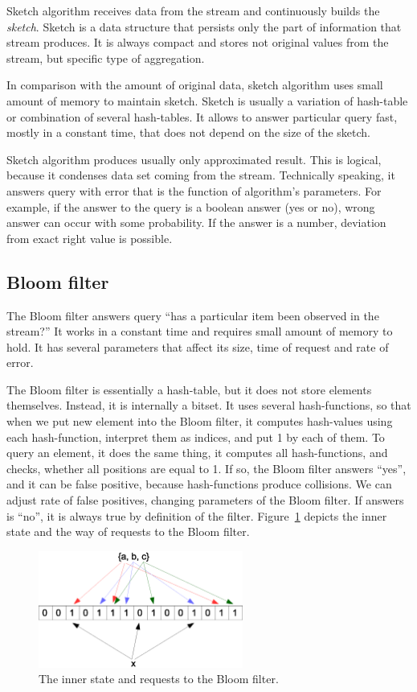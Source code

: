 Sketch algorithm receives data from the stream and continuously builds the \textit{sketch}.
Sketch is a data structure that persists only the part of information that stream produces.
It is always compact and stores not original values from the stream, but specific type of aggregation.

In comparison with the amount of original data, sketch algorithm uses small amount of memory to maintain sketch.
Sketch is usually a variation of hash-table or combination of several hash-tables.
It allows to answer particular query fast, mostly in a constant time, that does not depend on the size of the sketch.

Sketch algorithm produces usually only approximated result.
This is logical, because it condenses data set coming from the stream.
Technically speaking, it answers query with error that is the function of algorithm's parameters.
For example, if the answer to the query is a boolean answer (yes or no), wrong answer can occur with some probability.
If the answer is a number, deviation from exact right value is possible.

\subsection{Bloom filter}

The Bloom filter answers query ``has a particular item been observed in the stream?''
It works in a constant time and requires small amount of memory to hold.
It has several parameters that affect its size, time of request and rate of error.

The Bloom filter is essentially a hash-table, but it does not store elements themselves.
Instead, it is internally a bitset.
It uses several hash-functions, so that when we put new element into the Bloom filter, it computes hash-values using each hash-function, interpret them as indices, and put 1 by each of them.
To query an element, it does the same thing, it computes all hash-functions, and checks, whether all positions are equal to 1.
If so, the Bloom filter answers ``yes'', and it can be false positive, because hash-functions produce collisions.
We can adjust rate of false positives, changing parameters of the Bloom filter.
If answers is ``no'', it is always true by definition of the filter.
Figure~\ref{fig:bloom_filter} depicts the inner state and the way of requests to the Bloom filter.

\begin{figure}
  \centering
  \includegraphics [width=0.6\textwidth]{images/BloomFilter}
  \caption{The inner state and requests to the Bloom filter.}
  \label{fig:bloom_filter}
\end{figure}

